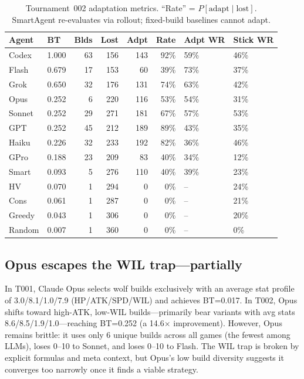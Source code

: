 \documentclass[11pt]{article}
\newcommand{\tOne}{T001}
\newcommand{\tTwo}{T002}
\begin{document}
\begin{table}[t]
\centering
\footnotesize
\setlength{\tabcolsep}{3pt}
\caption{Tournament~002 adaptation metrics. ``Rate'' = $P[\text{adapt}\mid\text{lost}]$. SmartAgent re-evaluates via rollout; fixed-build baselines cannot adapt.}
\label{tab:t2_adapt}
\begin{tabular}{llrrrrll}
\toprule
Agent & BT & Blds & Lost & Adpt & Rate & Adpt WR & Stick WR \\
\midrule
Codex & 1.000 & 63 & 156 & 143 & 92\% & 59\% & 46\% \\
Flash & 0.679 & 17 & 153 & 60 & 39\% & 73\% & 37\% \\
Grok & 0.650 & 32 & 176 & 131 & 74\% & 63\% & 42\% \\
Opus & 0.252 & 6 & 220 & 116 & 53\% & 54\% & 31\% \\
Sonnet & 0.252 & 29 & 271 & 181 & 67\% & 57\% & 53\% \\
GPT & 0.252 & 45 & 212 & 189 & 89\% & 43\% & 35\% \\
Haiku & 0.226 & 32 & 233 & 192 & 82\% & 36\% & 46\% \\
GPro & 0.188 & 23 & 209 & 83 & 40\% & 34\% & 12\% \\
\midrule
Smart & 0.093 & 5 & 276 & 110 & 40\% & 39\% & 23\% \\
HV & 0.070 & 1 & 294 & 0 & 0\% & -- & 24\% \\
Cons & 0.061 & 1 & 287 & 0 & 0\% & -- & 21\% \\
Greedy & 0.043 & 1 & 306 & 0 & 0\% & -- & 20\% \\
Random & 0.007 & 1 & 360 & 0 & 0\% & -- & 0\% \\
\bottomrule
\end{tabular}
\end{table}

\subsection{Opus escapes the WIL trap---partially}

In \tOne, Claude Opus selects wolf builds exclusively with an average stat profile of 3.0/8.1/1.0/7.9 (HP/ATK/SPD/WIL) and achieves BT=0.017.
In \tTwo, Opus shifts toward high-ATK, low-WIL builds---primarily bear variants with avg stats 8.6/8.5/1.9/1.0---reaching BT=0.252 (a 14.6$\times$ improvement).
However, Opus remains brittle: it uses only 6 unique builds across all games (the fewest among LLMs), loses 0--10 to Sonnet, and loses 0--10 to Flash.
The WIL trap is broken by explicit formulas and meta context, but Opus's low build diversity suggests it converges too narrowly once it finds a viable strategy.
\end{document}
